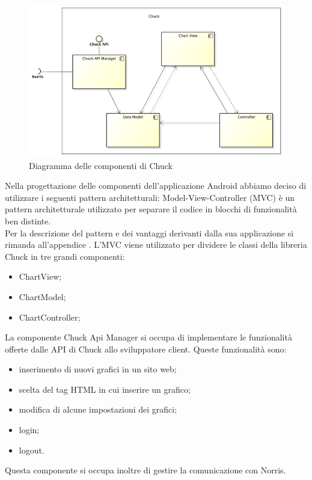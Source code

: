 	\begin{figure}[H]\centering
        \includegraphics[width=\textwidth]{SpecificaTecnica/Pics/ComponentiChuck}
        \caption{Diagramma delle componenti di Chuck}
    \end{figure}
Nella progettazione delle componenti dell'applicazione Android abbiamo deciso di utilizzare i seguenti pattern architetturali:
	Model-View-Controller (MVC) è un pattern architetturale utilizzato per separare il codice in blocchi di funzionalità ben distinte.\\
	Per la descrizione del pattern e dei vantaggi derivanti dalla sua applicazione si rimanda all'appendice .
	L'MVC viene utilizzato per dividere le classi della libreria Chuck in tre grandi componenti:
	\begin{itemize}
	\item ChartView;
	\item ChartModel;
	\item ChartController;
	\end{itemize}
    		La componente Chuck Api Manager si occupa di implementare le funzionalità offerte dalle API di Chuck allo sviluppatore client. Queste funzionalità sono:
    		\begin{itemize}
						\item inserimento di nuovi grafici in un sito web;
						\item scelta del tag HTML in cui inserire un grafico;
						\item modifica di alcune impostazioni dei grafici;
						\item login;
						\item logout.
			\end{itemize}
    		Questa componente si occupa inoltre di gestire la comunicazione con Norris.
    		
